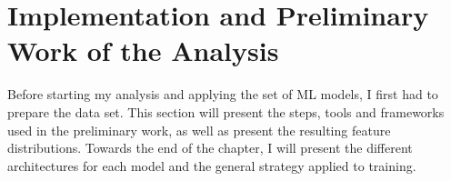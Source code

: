 \chapter{Implementation and Preliminary Work of the Analysis}\label{chap:Implementation}
Before starting my analysis and applying the set of \ac{ML} models, I first had to prepare the data set. This section 
will present the steps, tools and frameworks used in the preliminary work, as well as present the resulting feature distributions.
Towards the end of the chapter, I will present the different architectures for each model and the general strategy applied to training.

